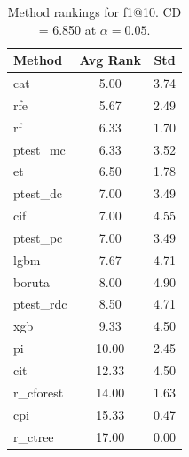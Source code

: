 \begin{table}[h]
\centering
\caption{Method rankings for f1@10. CD = 6.850 at $\alpha=0.05$.}
\label{tab:ranks_f1@10}
\begin{tabular}{lcc}
\toprule
Method & Avg Rank & Std \\
\midrule
cat & 5.00 & 3.74 \\
rfe & 5.67 & 2.49 \\
rf & 6.33 & 1.70 \\
ptest_mc & 6.33 & 3.52 \\
et & 6.50 & 1.78 \\
ptest_dc & 7.00 & 3.49 \\
cif & 7.00 & 4.55 \\
ptest_pc & 7.00 & 3.49 \\
lgbm & 7.67 & 4.71 \\
boruta & 8.00 & 4.90 \\
ptest_rdc & 8.50 & 4.71 \\
xgb & 9.33 & 4.50 \\
pi & 10.00 & 2.45 \\
cit & 12.33 & 4.50 \\
r_cforest & 14.00 & 1.63 \\
cpi & 15.33 & 0.47 \\
r_ctree & 17.00 & 0.00 \\
\bottomrule
\end{tabular}
\end{table}